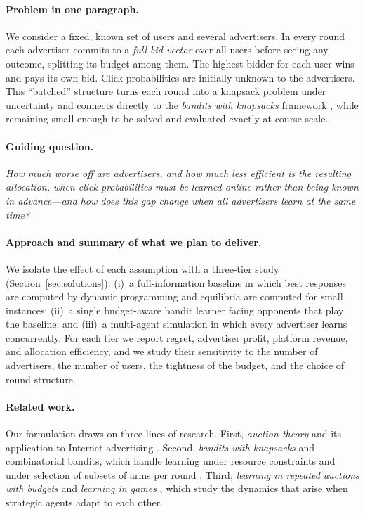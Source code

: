 \documentclass{article}
\theoremstyle{definition}
\theoremstyle{remark}
\begin{document}
\paragraph{Problem in one paragraph.} We consider a fixed, known set of users and several advertisers. In every round each advertiser commits to a \emph{full bid vector} over all users before seeing any outcome, splitting its budget among them. The highest bidder for each user wins and pays its own bid. Click probabilities are initially unknown to the advertisers. This ``batched'' structure turns each round into a knapsack problem under uncertainty and connects directly to the \emph{bandits with knapsacks} framework \citep{badanidiyuru2013bandits}, while remaining small enough to be solved and evaluated exactly at course scale.

\paragraph{Guiding question.} \emph{How much worse off are advertisers, and how much less efficient is the resulting allocation, when click probabilities must be learned online rather than being known in advance---and how does this gap change when all advertisers learn at the same time?}

\paragraph{Approach and summary of what we plan to deliver.} We isolate the effect of each assumption with a three-tier study (Section~\ref{sec:solutions}): (i)~a full-information baseline in which best responses are computed by dynamic programming and equilibria are computed for small instances; (ii)~a single budget-aware bandit learner facing opponents that play the baseline; and (iii)~a multi-agent simulation in which every advertiser learns concurrently. For each tier we report regret, advertiser profit, platform revenue, and allocation efficiency, and we study their sensitivity to the number of advertisers, the number of users, the tightness of the budget, and the choice of round structure.

\paragraph{Related work.} Our formulation draws on three lines of research. First, \emph{auction theory} and its application to Internet advertising \citep{vickrey1961counterspeculation,krishna2009auction,edelman2007internet,varian2007position}. Second, \emph{bandits with knapsacks} and combinatorial bandits, which handle learning under resource constraints and under selection of subsets of arms per round \citep{badanidiyuru2013bandits,chen2013combinatorial}. Third, \emph{learning in repeated auctions with budgets} \citep{balseiro2019learning,han2020optimal} and \emph{learning in games} \citep{fudenberg1998theory,shoham2008multiagent}, which study the dynamics that arise when strategic agents adapt to each other.
\end{document}
